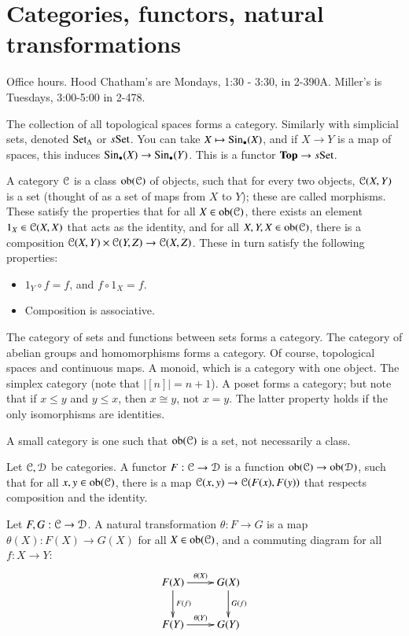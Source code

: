 \section{Categories, functors, natural transformations}\label{categories}
Office hours. Hood Chatham's are Mondays, 1:30 - 3:30, in 2-390A. Miller's is Tuesdays, 3:00-5:00 in 2-478.

The collection of all topological spaces forms a category. Similarly with simplicial sets, denoted ${\mathrm{Set}}_{\Delta}$ or $s{\mathrm{Set}}$. You can take $X\mapsto \mathrm{Sin}_\bullet(X)$, and if $X\to Y$ is a map of spaces, this induces $\mathrm{Sin}_\bullet(X)\to\mathrm{Sin}_\bullet(Y)$. This is a functor $\mathbf{Top}\to s{\mathrm{Set}}$.
\begin{definition}
A category $\mathcal C$ is a class $\mathrm{ob}(\mathcal C)$ of objects, such that for every two objects, $\mathcal C(X,Y)$ is a set (thought of as a set of maps from $X$ to $Y$); these are called morphisms. These satisfy the properties that for all $X\in\mathrm{ob}(\mathcal C)$, there exists an element $1_X\in\mathcal C(X,X)$ that acts as the identity, and for all $X,Y,X\in\mathrm{ob}(\mathcal C)$, there is a composition $\mathcal C(X,Y)\times\mathcal C(Y,Z)\to\mathcal C(X,Z)$. These in turn satisfy the following properties:
\begin{itemize}
\item $1_Y\circ f=f$, and $f\circ 1_X=f$.
\item Composition is associative.
\end{itemize}
\end{definition}
\begin{example}
The category of sets and functions between sets forms a category. The category of abelian groups and homomorphisms forms a category. Of course, topological spaces and continuous maps. A monoid, which is a category with one object. The simplex category (note that $|[n]|=n+1$). A poset forms a category; but note that if $x\leq y$ and $y\leq x$, then $x\cong y$, not $x=y$. The latter property holds if the only isomorphisms are identities.
\end{example}
A small category is one such that $\mathrm{ob}(\mathcal C)$ is a set, not necessarily a class.
\begin{definition}
Let $\mathcal C,\mathcal D$ be categories. A functor $F:\mathcal C\to\mathcal D$ is a function $\mathrm{ob}(\mathcal C)\to\mathrm{ob}(\mathcal D)$, such that for all $x,y\in\mathrm{ob}(\mathcal C)$, there is a map $\mathcal C(x,y)\to\mathcal C(F(x),F(y))$ that respects composition and the identity.

Let $F,G:\mathcal C\to\mathcal D$. A natural transformation $\theta:F\to G$ is a map $\theta(X):F(X)\to G(X)$ for all $X\in\mathrm{ob}(\mathcal C)$, and a commuting diagram for all $f:X\to Y$:
\begin{equation*}
\xymatrix{F(X)\ar[d]^{F(f)}\ar[r]^{\theta(X)} & G(X)\ar[d]^{G(f)}\\
F(Y)\ar[r]^{\theta(Y)} & G(Y)}
\end{equation*}
\end{definition}
